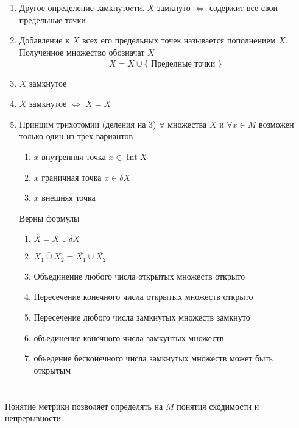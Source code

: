 \documentclass[14pt]{extarticle}
\DeclareMathOperator{\intt}{Int}
\begin{document}
\begin{enumerate}
	\item Другое определение замкнутоcти.  $X$ замкнуто  $\iff$ содержит все свои предельные точки
	\item Добавление к  $X$ всех его предельных точек 
		называется пополнением  $X$. Полученное множество
		обозначат  $\overline{X}$
		 \begin{equation}
			 \overline{X} = X \cup \{\text{~Пределные точки~}\}
		 \end{equation}
	\item $\overline{X}$ замкнутое
	\item $X$ замкнутое  $\iff$  $X = \overline{X}$
	 \item Принцим трихотомии (деления на 3)
		 $\forall $ множества $X$ и  $\forall  x \in M$ 
		 возможен только один из трех вариантов
		 \begin{enumerate}
		 	\item $x$ внутренняя точка $x \in \intt X$
			\item  $x$ граничная точка $x \in \delta X$
			\item  $x$ внешняя точка
		 \end{enumerate}
		Верны формулы
		\begin{enumerate}
			\item $\overline{X} = X \cup \delta X$
			 \item $\overline{X_1 \cup X_2} = \overline{X_1} \cup \overline{X_2}$
		\item Объединение любого числа открытых множеств открыто
		\item Пересечение конечного числа открытых множеств открыто
		\item Пересечение любого числа замкнутых множеств
			замкнуто
		\item объединение конечного числа замкунтых множеств
		\item объедение бесконечного числа замкнутых множеств может быть открытым
		\end{enumerate}
\end{enumerate}
\section{}
Понятие метрики позволяет определять на $M$ 
понятия сходимости и непрерывности.
\end{document}
